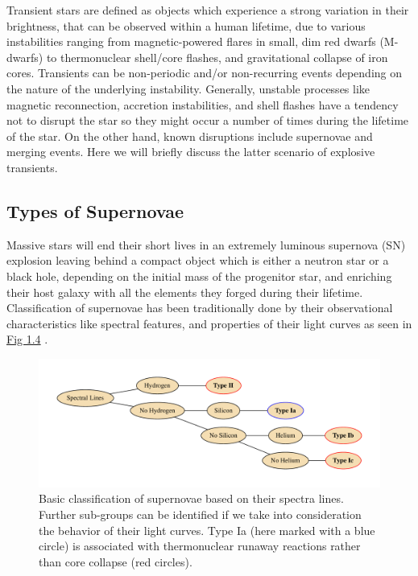 \documentclass[../../main/thesis_msc.tex]{subfiles}
\begin{document}
		Transient stars are defined as objects which experience a strong variation in their brightness, that can be observed within a human lifetime, due to various instabilities ranging from magnetic-powered flares in small, dim red dwarfs (M-dwarfs) to thermonuclear shell/core flashes, and gravitational collapse of iron cores. Transients can be non-periodic and/or non-recurring events depending on the nature of the underlying instability. Generally, unstable processes like magnetic reconnection, accretion instabilities, and shell flashes have a tendency not to disrupt the star so they might occur a number of times during the lifetime of the star. On the other hand, known disruptions include supernovae and merging events. Here we will briefly discuss the latter scenario of explosive transients.
		
			\subsection{Types of Supernovae}
			
				Massive stars will end their short lives in an extremely luminous supernova (SN) explosion leaving behind a compact object which is either a neutron star or a black hole, depending on the initial mass of the progenitor star, and enriching their host galaxy with all the elements they forged during their lifetime. Classification of supernovae has been traditionally done by their observational characteristics like spectral features, and properties of their light curves as seen in \hyperref[fig:SNe_classification]{Fig 1.4} \citep[see][]{Filippenko1997, Turatto2003}. 
				
				\begin{figure}[h]
					\centering
					\includegraphics[width = \textwidth]{../figures/chapter1/SNeClass.pdf}
					\caption{Basic classification of supernovae based on their spectra lines. Further sub-groups can be identified if we take into consideration the behavior of their light curves. Type Ia (here marked with a blue circle) is associated with thermonuclear runaway reactions rather than core collapse (red circles).}
					\label{fig:SNe_classification}
				\end{figure}
				
\end{document}
